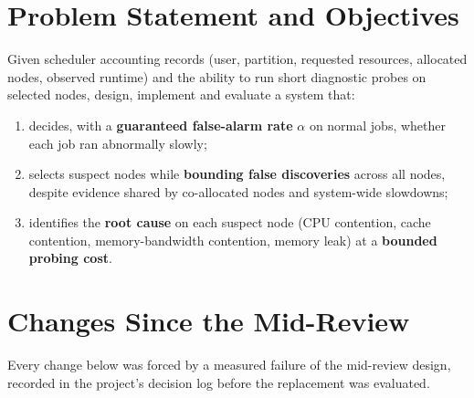 \documentclass[10pt,a4paper]{article}
\begin{document}
\section{Problem Statement and Objectives}
Given scheduler accounting records (user, partition, requested resources, allocated nodes, observed runtime) and the ability to run short diagnostic probes on selected nodes, design, implement and evaluate a system that:
\begin{enumerate}
\item decides, with a \textbf{guaranteed false-alarm rate} $\alpha$ on normal jobs, whether each job ran abnormally slowly;
\item selects suspect nodes while \textbf{bounding false discoveries} across all nodes, despite evidence shared by co-allocated nodes and system-wide slowdowns;
\item identifies the \textbf{root cause} on each suspect node (CPU contention, cache contention, memory-bandwidth contention, memory leak) at a \textbf{bounded probing cost}.
\end{enumerate}

\section{Changes Since the Mid-Review}\label{sec:changes}
Every change below was forced by a measured failure of the mid-review design, recorded in the project's decision log before the replacement was evaluated.
\end{document}
